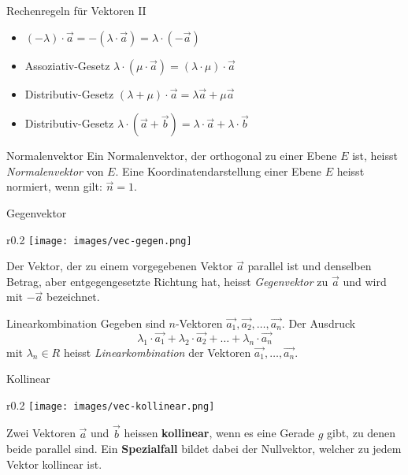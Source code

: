 \begin{theorem}{Rechenregeln für Vektoren II}
    \begin{itemize}
        \item $(-\lambda)\cdot\vec{a}=-(\lambda\cdot\vec{a})=\lambda\cdot(-\vec{a})$
        \item Assoziativ-Gesetz $\lambda\cdot(\mu\cdot\vec{a})=(\lambda\cdot\mu)\cdot\vec{a}$ 
        \item Distributiv-Gesetz $(\lambda+\mu)\cdot\vec{a}=\lambda\vec{a}+\mu\vec{a}$
        \item Distributiv-Gesetz $\lambda\cdot(\vec{a}+\vec{b})=\lambda\cdot\vec{a}+\lambda\cdot\vec{b}$
    \end{itemize}
\end{theorem}

\begin{definition}{Normalenvektor}
    Ein Normalenvektor, der orthogonal zu einer Ebene $E$ ist, heisst \textit{Normalenvektor} von $E$.
    Eine Koordinatendarstellung einer Ebene $E$ heisst normiert, wenn gilt: $\vec{n}=1$.
\end{definition}

\begin{definition}{Gegenvektor}
    \begin{wrapfigure}{r}{0.2\linewidth}
        \vspace{-10pt}
        \texttt{[image: images/vec-gegen.png]}
    \end{wrapfigure}
    Der Vektor, der zu einem vorgegebenen Vektor $\vec{a}$ parallel ist und denselben Betrag,
    aber entgegengesetzte Richtung hat, heisst \textit{Gegenvektor} zu $\vec{a}$ und wird mit $-\vec{a}$ bezeichnet.
\end{definition}

\begin{definition}{Linearkombination}
    Gegeben sind $n$-Vektoren $\vec{a_1},\vec{a_2},\ldots,\vec{a_n}$.
    Der Ausdruck
    \begin{equation*}
        \lambda_1\cdot\vec{a_1}+\lambda_2\cdot\vec{a_2}+\ldots+\lambda_n\cdot\vec{a_n}
    \end{equation*}
    mit $\lambda_n\in R$ heisst \textit{Linearkombination} der Vektoren $\vec{a_1},\ldots,\vec{a_n}$.
\end{definition}

\begin{definition}{Kollinear}
    \begin{wrapfigure}{r}{0.2\linewidth}
        \vspace{-10pt}
        \texttt{[image: images/vec-kollinear.png]}
    \end{wrapfigure}
    Zwei Vektoren $\vec{a}$ und $\vec{b}$ heissen \textbf{kollinear}, 
    wenn es eine Gerade $g$ gibt, zu denen beide parallel sind. 
    Ein \textbf{Spezialfall} bildet dabei der Nullvektor, welcher zu jedem Vektor kollinear ist.
\end{definition}

